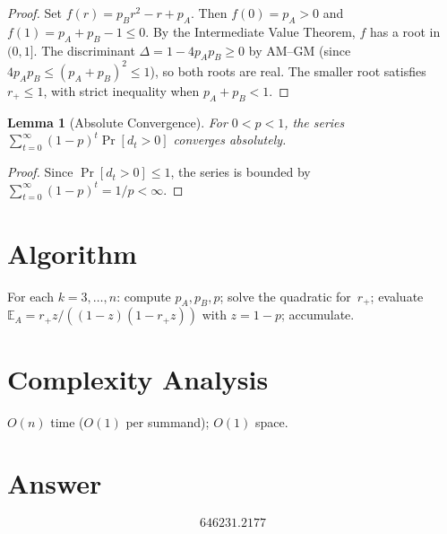 \documentclass[11pt]{article}
\newtheorem{lemma}[theorem]{Lemma}
\begin{document}
\begin{proof}
Set $f(r) = p_B r^2 - r + p_A$. Then $f(0) = p_A > 0$ and $f(1) = p_A + p_B - 1 \le 0$. By the Intermediate Value Theorem, $f$ has a root in $(0,1]$. The discriminant $\Delta = 1 - 4p_Ap_B \ge 0$ by AM--GM (since $4p_Ap_B \le (p_A+p_B)^2 \le 1$), so both roots are real. The smaller root satisfies $r_+ \le 1$, with strict inequality when $p_A + p_B < 1$.
\end{proof}

\begin{lemma}[Absolute Convergence]
For $0 < p < 1$, the series $\sum_{t=0}^{\infty}(1-p)^t\Pr[d_t > 0]$ converges absolutely.
\end{lemma}

\begin{proof}
Since $\Pr[d_t > 0] \le 1$, the series is bounded by $\sum_{t=0}^{\infty}(1-p)^t = 1/p < \infty$.
\end{proof}

\section{Algorithm}

For each $k = 3, \ldots, n$: compute $p_A, p_B, p$; solve the quadratic for~$r_+$; evaluate $\mathbb{E}_A = r_+ z / ((1-z)(1-r_+z))$ with $z = 1-p$; accumulate.

\section{Complexity Analysis}

$O(n)$ time ($O(1)$ per summand); $O(1)$ space.

\section{Answer}

\[
\boxed{646231.2177}
\]
\end{document}
